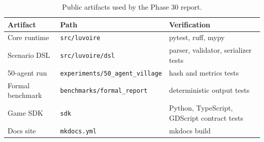 \begin{table}[h]
\centering
\begin{tabular}{lll}
\toprule
Artifact & Path & Verification \\
\midrule
Core runtime & \texttt{src/luvoire} & pytest, ruff, mypy \\
Scenario DSL & \texttt{src/luvoire/dsl} & parser, validator, serializer tests \\
50-agent run & \texttt{experiments/50\_agent\_village} & hash and metrics tests \\
Formal benchmark & \texttt{benchmarks/formal\_report} & deterministic output tests \\
Game SDK & \texttt{sdk} & Python, TypeScript, GDScript contract tests \\
Docs site & \texttt{mkdocs.yml} & mkdocs build \\
\bottomrule
\end{tabular}
\caption{Public artifacts used by the Phase 30 report.}
\label{tab:release-artifacts}
\end{table}
